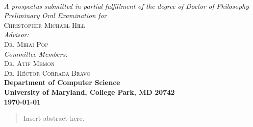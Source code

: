 \documentclass{article}
\begin{document}
 




\begin{titlepage}
\begin{center}

\textsc{\huge \bfseries {}}\\
 
\emph{A prospectus submitted in partial fulfillment of the degree of Doctor of
Philosophy}\\[5.5cm]


\emph{Preliminary Oral Examination for}\\
\textsc{\large Christopher Michael Hill}\\[2.0cm] %
\emph{Advisor:} \\
\textsc{Dr. Mihai Pop}\\[.5cm]
\emph{Committee Members:}\\
\textsc{Dr. Atif Memon}\\
\textsc{Dr. H\'ector Corrada Bravo}\\[4.0cm]

{\bfseries Department of Computer Science}\\
{\bfseries University of Maryland, College Park, MD 20742}\\
{\bfseries \mydate\today}
\vfill

\end{center}
\end{titlepage}

\newpage
\thispagestyle{empty}
\mbox{}


\newpage
\setcounter{page}{1}
\doublespacing
\begin{abstract}

Insert abstract here.

\end{abstract}

\newpage
\tableofcontents

\newpage
\listoffigures

\newpage
\doublespacing



\end{document}
